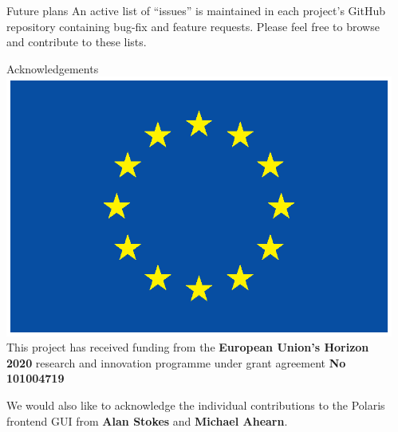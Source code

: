 \documentclass[final]{beamer}
\newlength{\sepwidth}
\newlength{\colwidth}
\newcommand{\separatorcolumn}{\begin{column}{\sepwidth}\end{column}}
\begin{document}
\begin{frame}[t]
\begin{columns}[t]
\begin{column}{\colwidth}
\begin{exampleblock}{Future plans}
                    An active list of ``issues'' is maintained in each project's GitHub repository containing
                    bug-fix and feature requests.
                    Please feel free to browse and contribute to these lists.

                \end{exampleblock}

                \begin{block}{Acknowledgements}
                    \includegraphics[height=\baselineskip]{logos/EU_flag_yellow_eps}
                    This project has received funding from the \textbf{European Union’s Horizon 2020} research and
                    innovation programme under grant agreement \textbf{No 101004719}

                    We would also like to acknowledge the individual contributions to the Polaris frontend
                    GUI from \textbf{Alan Stokes} and \textbf{Michael Ahearn}.
                \end{block}





            \end{column}
            \separatorcolumn
        \end{columns}

    \end{frame}
\end{document}
